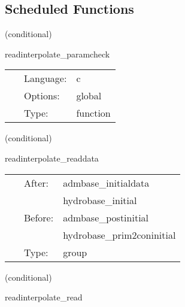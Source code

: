 \subsection*{Scheduled Functions}
\vspace{5mm}

   (conditional) 

\hspace{5mm} readinterpolate\_paramcheck 

\hspace{5mm}{\it sanity check given parameters } 


\hspace{5mm}

 \begin{tabular*}{160mm}{cll} 
~ & Language:  & c \\ 
~ & Options:  & global \\ 
~ & Type:  & function \\ 
\end{tabular*} 


\vspace{5mm}

   (conditional) 

\hspace{5mm} readinterpolate\_readdata 

\hspace{5mm}{\it read in datasets from disk } 


\hspace{5mm}

 \begin{tabular*}{160mm}{cll} 
~ & After:  & admbase\_initialdata \\ 
~& ~ &hydrobase\_initial\\ 
~ & Before:  & admbase\_postinitial \\ 
~& ~ &hydrobase\_prim2coninitial\\ 
~ & Type:  & group \\ 
\end{tabular*} 


\vspace{5mm}

   (conditional) 

\hspace{5mm} readinterpolate\_read 

\hspace{5mm}{\it read in datasets } 


\hspace{5mm}

